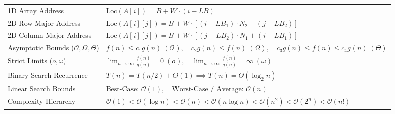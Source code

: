 \documentclass[12pt,a4paper]{article}
\renewcommand{\arraystretch}{1.45}
\begin{document}
\begin{tcolorbox}[formulabox, title={\textbf{Key Formulas and Asymptotic Relations at a Glance}}]
\renewcommand{\arraystretch}{1.25}
\begin{tabularx}{\linewidth}{B{5.0cm} X}
1D Array Address & $\text{Loc}(A[i]) = B + W \cdot (i - LB)$ \\[2pt]
2D Row-Major Address & $\text{Loc}(A[i][j]) = B + W \cdot [(i - LB_1) \cdot N_2 + (j - LB_2)]$ \\[2pt]
2D Column-Major Address & $\text{Loc}(A[i][j]) = B + W \cdot [(j - LB_2) \cdot N_1 + (i - LB_1)]$ \\[2pt]
Asymptotic Bounds ($\mathcal{O}, \Omega, \Theta$) & $f(n) \le c_1 g(n) \;(\mathcal{O}), \quad c_2 g(n) \le f(n) \;(\Omega), \quad c_3 g(n) \le f(n) \le c_4 g(n) \;(\Theta)$ \\[2pt]
Strict Limits ($o, \omega$) & $\lim_{n \to \infty} \frac{f(n)}{g(n)} = 0 \;(o), \quad \lim_{n \to \infty} \frac{f(n)}{g(n)} = \infty \;(\omega)$ \\[2pt]
Binary Search Recurrence & $T(n) = T(n/2) + \Theta(1) \implies T(n) = \Theta(\log_2 n)$ \\[2pt]
Linear Search Bounds & $\text{Best-Case: } \mathcal{O}(1), \quad \text{Worst-Case / Average: } \mathcal{O}(n)$ \\[2pt]
Complexity Hierarchy & $\mathcal{O}(1) < \mathcal{O}(\log n) < \mathcal{O}(n) < \mathcal{O}(n \log n) < \mathcal{O}(n^2) < \mathcal{O}(2^n) < \mathcal{O}(n!)$ \\[2pt]
\end{tabularx}
\end{tcolorbox}
\end{document}
